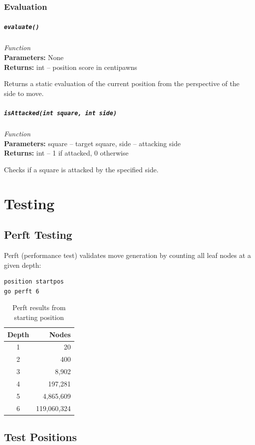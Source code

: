 \documentclass[11pt,a4paper]{report}
\newcommand{\function}[4]{%
    \paragraph{\texttt{#1}} \hfill \textit{#2}\\
    \textbf{Parameters:} #3\\
    \textbf{Returns:} #4
}
\begin{document}
\subsection{Evaluation}

\function{evaluate()}{Function}{None}{int -- position score in centipawns}

Returns a static evaluation of the current position from the perspective of the side to move.

\function{isAttacked(int square, int side)}{Function}{square -- target square, side -- attacking side}{int -- 1 if attacked, 0 otherwise}

Checks if a square is attacked by the specified side.

\chapter{Testing}

\section{Perft Testing}

Perft (performance test) validates move generation by counting all leaf nodes at a given depth:

\begin{lstlisting}[language=bash]
position startpos
go perft 6
\end{lstlisting}

\begin{table}[h]
\centering
\begin{tabular}{cr}
\toprule
\textbf{Depth} & \textbf{Nodes} \\
\midrule
1 & 20 \\
2 & 400 \\
3 & 8,902 \\
4 & 197,281 \\
5 & 4,865,609 \\
6 & 119,060,324 \\
\bottomrule
\end{tabular}
\caption{Perft results from starting position}
\end{table}

\section{Test Positions}
\end{document}
